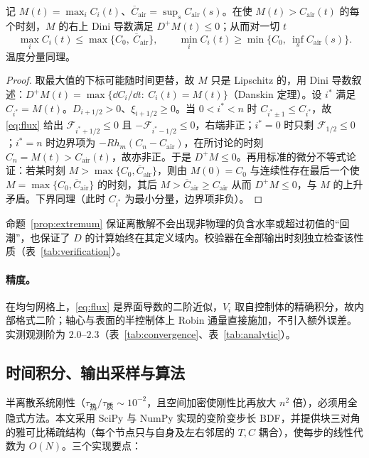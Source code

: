 \begin{proposition}[离散极值原理]\label{prop:extremum}
记 $M(t)=\max_iC_i(t)$、$\overline C_{\mathrm{air}}=\sup_{s}C_{\mathrm{air}}(s)$。在使 $M(t)>C_{\mathrm{air}}(t)$ 的每个时刻，$M$ 的右上 Dini 导数满足 $D^{+}M(t)\le0$；从而对一切 $t$
$$\max_i C_i(t)\le\max\bigl\{C_0,\ \overline C_{\mathrm{air}}\bigr\},\qquad
\min_i C_i(t)\ge\min\bigl\{C_0,\ \inf_sC_{\mathrm{air}}(s)\bigr\}.$$
温度分量同理。
\end{proposition}
\begin{proof}
取最大值的下标可能随时间更替，故 $M$ 只是 Lipschitz 的，用 Dini 导数叙述：$D^{+}M(t)=\max\{\dd C_i/\dd t:\ C_i(t)=M(t)\}$（Danskin 定理）。设 $i^\ast$ 满足 $C_{i^\ast}=M(t)$。$D_{i+1/2}>0$、$\xi_{i+1/2}\ge0$。当 $0<i^\ast<n$ 时 $C_{i^\ast\pm1}\le C_{i^\ast}$，故\eqref{eq:flux} 给出 $\mathcal F_{i^\ast+1/2}\le0$ 且 $-\mathcal F_{i^\ast-1/2}\le0$，右端非正；$i^\ast=0$ 时只剩 $\mathcal F_{1/2}\le0$；$i^\ast=n$ 时边界项为 $-Rh_m(C_n-C_{\mathrm{air}})$，在所讨论的时刻 $C_n=M(t)>C_{\mathrm{air}}(t)$，故亦非正。于是 $D^{+}M\le0$。再用标准的微分不等式论证：若某时刻 $M>\max\{C_0,\overline C_{\mathrm{air}}\}$，则由 $M(0)=C_0$ 与连续性存在最后一个使 $M=\max\{C_0,\overline C_{\mathrm{air}}\}$ 的时刻，其后 $M>\overline C_{\mathrm{air}}\ge C_{\mathrm{air}}$ 从而 $D^{+}M\le0$，与 $M$ 的上升矛盾。下界同理（此时 $C_{i^\ast}$ 为最小分量，边界项非负）。
\end{proof}

\noindent
命题~\ref{prop:extremum} 保证离散解不会出现非物理的负含水率或超过初值的“回潮”，也保证了 $D$ 的计算始终在其定义域内。校验器在全部输出时刻独立检查该性质（表~\ref{tab:verification}）。

\paragraph{精度。} 在均匀网格上，\eqref{eq:flux} 是界面导数的二阶近似，$V_i$ 取自控制体的精确积分，故内部格式二阶；轴心与表面的半控制体上 Robin 通量直接施加，不引入额外误差。实测观测阶为 $2.0$--$2.3$（表~\ref{tab:convergence}、表~\ref{tab:analytic}）。

\subsection{时间积分、输出采样与算法}
\label{subsec:time}

半离散系统刚性（$\tau_{\text{热}}/\tau_{\text{质}}\sim10^{-2}$，且空间加密使刚性比再放大 $n^2$ 倍），必须用全隐式方法。本文采用 SciPy\cite{scipy2020} 与 NumPy\cite{harris2020} 实现的变阶变步长 BDF\cite{hairer1996,shampine1997}，并提供块三对角的雅可比稀疏结构（每个节点只与自身及左右邻居的 $T,C$ 耦合），使每步的线性代数为 $O(N)$。三个实现要点：


